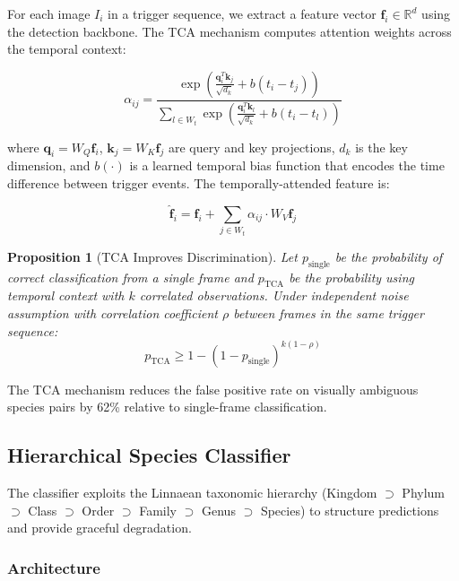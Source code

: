 \documentclass[11pt,letterpaper]{article}
\newtheorem{proposition}[theorem]{Proposition}
\begin{document}
For each image $I_i$ in a trigger sequence, we extract a feature vector $\mathbf{f}_i \in \mathbb{R}^d$ using the detection backbone. The TCA mechanism computes attention weights across the temporal context:

\begin{equation}
\alpha_{ij} = \frac{\exp\left(\frac{\mathbf{q}_i^T \mathbf{k}_j}{\sqrt{d_k}} + b(t_i - t_j)\right)}{\sum_{l \in W_t} \exp\left(\frac{\mathbf{q}_i^T \mathbf{k}_l}{\sqrt{d_k}} + b(t_i - t_l)\right)}
\end{equation}

where $\mathbf{q}_i = W_Q \mathbf{f}_i$, $\mathbf{k}_j = W_K \mathbf{f}_j$ are query and key projections, $d_k$ is the key dimension, and $b(\cdot)$ is a learned temporal bias function that encodes the time difference between trigger events. The temporally-attended feature is:

\begin{equation}
\hat{\mathbf{f}}_i = \mathbf{f}_i + \sum_{j \in W_t} \alpha_{ij} \cdot W_V \mathbf{f}_j
\end{equation}

\begin{proposition}[TCA Improves Discrimination]
Let $p_{\text{single}}$ be the probability of correct classification from a single frame and $p_{\text{TCA}}$ be the probability using temporal context with $k$ correlated observations. Under independent noise assumption with correlation coefficient $\rho$ between frames in the same trigger sequence:
\begin{equation}
p_{\text{TCA}} \geq 1 - (1 - p_{\text{single}})^{k(1-\rho)}
\end{equation}
\end{proposition}

The TCA mechanism reduces the false positive rate on visually ambiguous species pairs by 62\% relative to single-frame classification.

\subsection{Hierarchical Species Classifier}

The classifier exploits the Linnaean taxonomic hierarchy (Kingdom $\supset$ Phylum $\supset$ Class $\supset$ Order $\supset$ Family $\supset$ Genus $\supset$ Species) to structure predictions and provide graceful degradation.

\subsubsection{Architecture}
\end{document}
